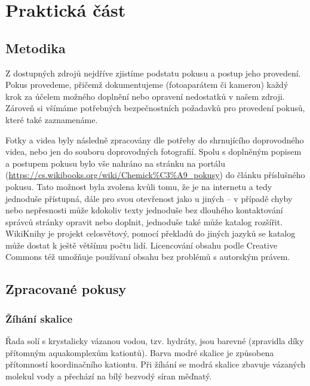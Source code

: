 \chapter{Praktická část}

\section{Metodika}
Z dostupných zdrojů nejdříve zjistíme podstatu pokusu a postup jeho provedení. Pokus provedeme, přičemž dokumentujeme (fotoaparátem či kamerou) každý krok za účelem možného doplnění nebo opravení nedostatků v našem zdroji. Zároveň si všímáme potřebných bezpečnostních požadavků pro provedení pokusů, které také zaznamenáme.

Fotky a videa byly následně zpracovány dle potřeby do shrnujícího doprovodného videa, nebo jen do souboru doprovodných fotografií. Spolu s doplněným popisem a postupem pokusu bylo vše nahráno na stránku  na portálu  (\url{https://cs.wikibooks.org/wiki/Chemick%C3%A9_pokusy}) do článku příslušného pokusu. Tato možnost byla zvolena kvůli tomu, že je na internetu a tedy jednoduše přístupná, dále pro svou otevřenost jako u jiných \uv{wiki projektů} -- v případě chyby nebo nepřesnosti může kdokoliv texty jednoduše bez dlouhého kontaktování správců stránky opravit nebo doplnit, jednoduše také může katalog rozšířit. WikiKnihy je projekt celosvětový, pomocí překladů do jiných jazyků se katalog může dostat k ještě většímu počtu lidí. Licencování obsahu podle Creative Commons též umožňuje používaní obsahu bez problémů s autorským právem.


\section{Zpracované pokusy}
\subsection{Žíhání skalice}



Řada solí s krystalicky vázanou vodou, tzv. hydráty, jsou barevné (zpravidla díky přítomným aquakomplexům kationtů). Barva modré skalice je způsobena přítomností koordinačního kationtu. Při žíhání se modrá skalice zbavuje vázaných molekul vody a přechází na bílý bezvodý síran měďnatý.

